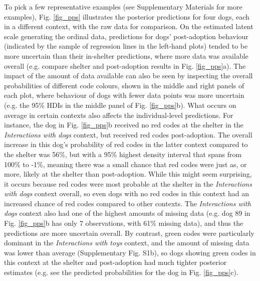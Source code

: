 \documentclass[12pt]{article}
\begin{document}
To pick a few representative examples (see Supplementary Materials for more examples), Fig. \ref{fig_pps} illustrates the posterior predictions for four dogs, each in a different context, with the raw data for comparison. On the estimated latent scale generating the ordinal data, predictions for dogs' post-adoption behaviour (indicated by the sample of regression lines in the left-hand plots) tended to be more uncertain than their in-shelter predictions, where more data was available overall (e.g. compare shelter and post-adoption results in Fig. \ref{fig_pps}a). The impact of the amount of data available can also be seen by inspecting the overall probabilities of different code colours, shown in the middle and right panels of each plot, where behaviour of dogs with fewer data points was more uncertain (e.g. the 95\% HDIs in the middle panel of Fig. \ref{fig_pps}b). What occurs on average in certain contexts also affects the individual-level predictions. For instance, the dog in Fig. \ref{fig_pps}b received no red codes at the shelter in the \textit{Interactions with dogs} context, but received red codes post-adoption. The overall increase in this dog's probability of red codes in the latter context compared to the shelter was 56\%, but with a 95\% highest density interval that spans from 100\% to -1\%, meaning there was a small chance that red codes were just as, or more, likely at the shelter than post-adoption. While this might seem surprising, it occurs because red codes were most probable at the shelter in the \textit{Interactions with dogs} context overall, so even dogs with no red codes in this context had an increased chance of red codes compared to other contexts. The \textit{Interactions with dogs} context also had one of the highest amounts of missing data (e.g. dog 89 in Fig. \ref{fig_pps}b has only 7 observations, with 61\% missing data), and thus the predictions are more uncertain overall. By contrast, green codes were particularly dominant in the \textit{Interactions with toys} context, and the amount of missing data was lower than average (Supplementary Fig. S1b), so dogs showing green codes in this context at the shelter and post-adoption had much tighter posterior estimates (e.g. see the predicted probabilities for the dog in Fig. \ref{fig_pps}c).
\end{document}
